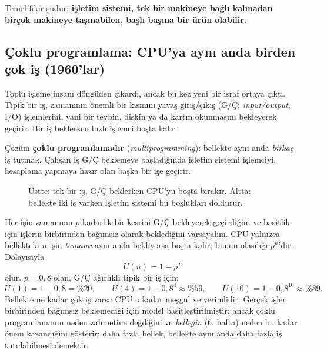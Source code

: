 \documentclass[11pt,a4paper]{article}
\newcommand{\term}[1]{\textbf{\color{mintdeep}#1}}
\begin{document}
Temel fikir şudur: \textbf{işletim sistemi, tek bir makineye bağlı kalmadan birçok makineye taşınabilen, başlı başına bir ürün olabilir.}

\subsection{Çoklu programlama: CPU'ya aynı anda birden çok iş (1960'lar)}
\label{sec:multiprog}

Toplu işleme insanı döngüden çıkardı, ancak bu kez yeni bir israf ortaya çıktı. Tipik bir iş, zamanının önemli bir kısmını yavaş giriş/çıkış (G/Ç; \emph{input/output}, I/O) işlemlerini, yani bir teybin, diskin ya da kartın okunmasını bekleyerek geçirir. Bir iş beklerken hızlı işlemci boşta kalır.

Çözüm \term{çoklu programlamadır} (\emph{multiprogramming}): bellekte aynı anda \emph{birkaç} iş tutmak. Çalışan iş G/Ç beklemeye başladığında işletim sistemi işlemciyi, hesaplama yapmaya hazır olan başka bir işe geçirir.

\begin{figure}[H]
\centering
{}
\caption{Üstte: tek bir iş, G/Ç beklerken CPU'yu boşta bırakır. Altta: bellekte iki iş varken işletim sistemi bu boşlukları doldurur.}
\end{figure}

\begin{example}
Her işin zamanının $p$ kadarlık bir kesrini G/Ç bekleyerek geçirdiğini ve basitlik için işlerin birbirinden bağımsız olarak beklediğini varsayalım. CPU yalnızca bellekteki $n$ işin \emph{tamamı} aynı anda bekliyorsa boşta kalır; bunun olasılığı $p^{n}$'dir. Dolayısıyla
\[
U(n) = 1 - p^{\,n}
\]
olur. $p = 0{,}8$ olan, G/Ç ağırlıklı tipik bir iş için:
\[
U(1) = 1 - 0{,}8 = \%20, \qquad U(4) = 1 - 0{,}8^{4} \approx \%59, \qquad U(10) = 1 - 0{,}8^{10} \approx \%89.
\]
Bellekte ne kadar çok iş varsa CPU o kadar meşgul ve verimlidir. Gerçek işler birbirinden bağımsız beklemediği için model basitleştirilmiştir; ancak çoklu programlamanın neden zahmetine değdiğini ve \emph{belleğin} (6. hafta) neden bu kadar önem kazandığını gösterir: daha fazla bellek, bellekte aynı anda daha fazla iş tutulabilmesi demektir.
\end{example}
\end{document}
